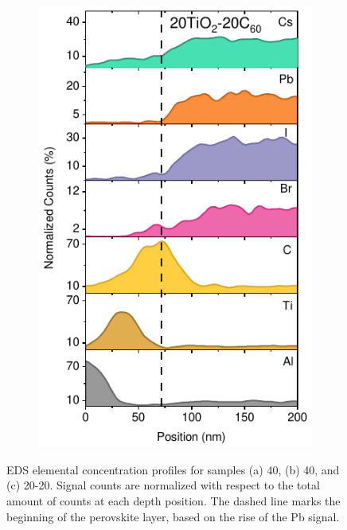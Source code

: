 \begin{figure}[htbp]
\begin{subfigure}{0.32\textwidth}
        \includegraphics[width=\textwidth]{chapters/transport_layers/images/TEM_20_20.pdf}
        \caption{}
        \label{}
    \end{subfigure}
    
    \caption[EDS elemental concentration profiles for samples 40, 40, or 20-20 as the ETL.]{EDS elemental concentration profiles for samples (a) 40, (b) 40, and (c) 20-20. Signal counts are normalized with respect to the total amount of counts at each depth position. The dashed line marks the beginning of the perovskite layer, based on the rise of the Pb signal.}
    \label{fig:etl_opt:eds_concentration}
\end{figure}

